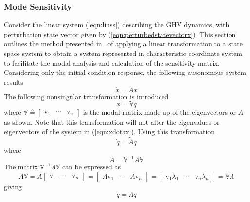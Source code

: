 \subsubsection*{Mode Sensitivity}
Consider the linear system (\ref{eqn:linss}) describing the GHV dynamics, with perturbation state vector given by (\ref{eqn:perturbedstatevectorx}).
This section outlines the method presented in\ \cite{etkin.atmosphericflight.1972} of applying a linear transformation to a state space system to obtain a system represented in characteristic coordinate system to facilitate the modal analysis and calculation of the sensitivity matrix.
Considering only the initial condition response, the following autonomous system results
\begin{equation}
  \label{eqn:xdotax}
  \dot{x}=Ax
\end{equation}
The following nonsingular transformation is introduced
\begin{equation}
  x=\mathbb{V}q
\end{equation}
where $\mathbb{V}\triangleq[\begin{array}{ccc} \mathrm{v}_{1} & \cdots & \mathrm{v}_{n} \end{array}]$ is the modal matrix made up of the eigenvectors or $A$ as shown.
Note that this transformation will not alter the eigenvalues or eigenvectors of the system in (\ref{eqn:xdotax}).
Using this transformation
\begin{equation}
  \dot{q}=\tilde{A}q
\end{equation}
where
\begin{equation}
  \tilde{A}=\mathbb{V}^{-1}A\mathbb{V}
\end{equation}
The matrix $\mathbb{V}^{-1}A\mathbb{V}$ can be expressed as
\begin{equation}
  A\mathbb{V}
  =A \left[
  \begin{array}{ccc}
    \mathrm{v}_{1} & \cdots & \mathrm{v}_{n}
  \end{array} \right]
  =\left[
  \begin{array}{ccc}
    A\mathrm{v}_{1} & \cdots & A\mathrm{v}_{n}
  \end{array}\right]
  =\left[
  \begin{array}{ccc}
    \mathrm{v}_{1}\lambda_{1} & \cdots & \mathrm{v}_{n}\lambda_{n}
  \end{array}\right]
  =\mathbb{V}\Lambda%
\end{equation}
giving
\begin{equation}
  \dot{q}=\Lambda{q}
\end{equation}
